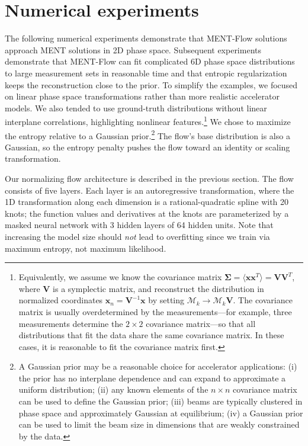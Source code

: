 \documentclass[%
    reprint,
    twocolumn,
    nofootinbib,
    amsmath,
    amssymb,
    aps,
    prstab,
]{revtex4-2}
\newcommand{\vect}[1]{\boldsymbol{\mathbf{#1}}}
\begin{document}
\section{Numerical experiments} \label{sec:experiments}

The following numerical experiments demonstrate that MENT-Flow solutions approach MENT solutions in 2D phase space. Subsequent experiments demonstrate that MENT-Flow can fit complicated 6D phase space distributions to large measurement sets in reasonable time and that entropic regularization keeps the reconstruction close to the prior. To simplify the examples, we focused on linear phase space transformations rather than more realistic accelerator models. We also tended to use ground-truth distributions without linear interplane correlations, highlighting nonlinear features.\footnote{Equivalently, we assume we know the covariance matrix $\vect{\Sigma} = \langle \vect{x}\vect{x}^T \rangle = \vect{V}\vect{V}^T$, where $\mathbf{V}$ is a symplectic matrix, and reconstruct the distribution in normalized coordinates $\vect{x}_n = \vect{V}^{-1}\vect{x}$ by setting $\mathcal{M}_k \rightarrow \mathcal{M}_k \vect{V}$. The covariance matrix is usually overdetermined by the measurements---for example, three measurements determine the $2 \times 2$ covariance matrix---so that all distributions that fit the data share the same covariance matrix. In these cases, it is reasonable to fit the covariance matrix first.} We chose to maximize the entropy relative to a Gaussian prior.\footnote{A Gaussian prior may be a reasonable choice for accelerator applications: (i) the prior has no interplane dependence and can expand to approximate a uniform distribution; (ii) any known elements of the $n \times n$ covariance matrix can be used to define the Gaussian prior; (iii) beams are typically clustered in phase space and approximately Gaussian at equilibrium; (iv) a Gaussian prior can be used to limit the beam size in dimensions that are weakly constrained by the data.} The flow's base distribution is also a Gaussian, so the entropy penalty pushes the flow toward an identity or scaling transformation.

Our normalizing flow architecture is described in the previous section. The flow consists of five layers. Each layer is an autoregressive transformation, where the 1D transformation along each dimension is a rational-quadratic spline with 20 knots; the function values and derivatives at the knots are parameterized by a masked neural network with 3 hidden layers of 64 hidden units. Note that increasing the model size should \textit{not} lead to overfitting since we train via maximum entropy, not maximum likelihood. 
\end{document}
